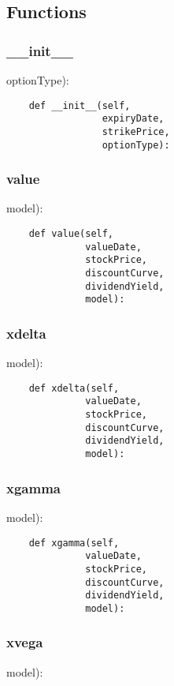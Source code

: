\documentclass[twoside,11pt]{book}
\begin{document}
\subsection*{Functions}

\subsubsection*{{\bf \_\_init\_\_}}
optionType): 

\begin{lstlisting}
    def __init__(self,
                 expiryDate,
                 strikePrice,
                 optionType):
\end{lstlisting}

\subsubsection*{{\bf value}}
model): 

\begin{lstlisting}
    def value(self,
              valueDate,
              stockPrice,
              discountCurve,
              dividendYield,
              model):
\end{lstlisting}

\subsubsection*{{\bf xdelta}}
model): 

\begin{lstlisting}
    def xdelta(self,
              valueDate,
              stockPrice,
              discountCurve,
              dividendYield,
              model):
\end{lstlisting}

\subsubsection*{{\bf xgamma}}
model): 

\begin{lstlisting}
    def xgamma(self,
              valueDate,
              stockPrice,
              discountCurve,
              dividendYield,
              model):
\end{lstlisting}

\subsubsection*{{\bf xvega}}
model): 
\end{document}
